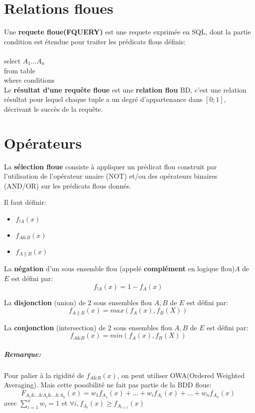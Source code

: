 \documentclass[10pt,a4paper]{report}
\begin{document}
\chapter{Relations floues}
Une \textbf{requete floue(FQUERY)} est une requete exprimée en SQL, dont la partie condition est étendue pour traiter les prédicats flous définis:\\\\
select $A_1$...$A_n$\\
from table\\
where conditions\\

Le \textbf{résultat d'une requête floue} est une \textbf{relation flou} BD, c'est une relation résultat pour lequel chaque tuple a un degré d'appartenance dans $[0;1]$, décrivant le succès de la requête.

\chapter{Opérateurs}
La \textbf{sélection floue} consiste à appliquer un prédicat flou construit par l’utilisation de l'opérateur unaire (NOT) et/ou des opérateurs binaires (AND/OR) sur les prédicats flous donnés.

\par Il faut définir:
\begin{itemize}
\item$f_{!A}(x)$
\item$f_{A\&B}(x)$
\item$f_{A\|B}(x)$
\end{itemize} 

La \textbf{négation} d'un sous ensemble flou (appelé \textbf{complément} en logique flou)$A$ de $E$ est défini par:$$f_{!A}(x)=1-f_A(x)$$

La \textbf{disjonction} (union) de 2 sous ensembles flou $A,B$ de $E$ est défini par:
$$f_{A\|B}(x)=max(f_A(x),f_B(X))$$

La \textbf{conjonction} (intersection) de 2 sous ensembles flou $A,B$ de $E$ est défini par:
$$f_{A\&B}(x)=min(f_A(x),f_B(X))$$

\paragraph{Remarque: \\}
Pour palier à la rigidité de $f_{A\&B}(x)$, on peut utiliser OWA(Ordered Weighted Averaging). Mais cette possibilité ne fait pas partie de la BDD floue:
$$ F_{A_1\&...\&A_i\&...\&A_n}(x)=w_1f_{A_1}(x)+...+w_if_{A_i}(x)+...+w_nf_{A_n}(x)$$
avec $\sum_{i=1}^{n} w_i=1$ et $\forall i,f_{A_i}(x)\geq f_{A_{i+1}}(x)$
\end{document}

